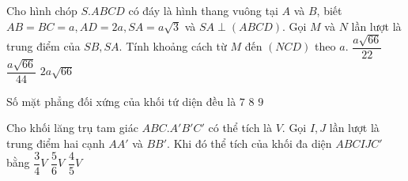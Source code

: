 				
	\begin{ex} %
	Cho hình chóp $S.ABCD$ có đáy là hình thang vuông tại $A$ và $B$, biết $AB = BC = a, AD = 2a, SA = a\sqrt{3}$ và $SA \perp (ABCD)$. Gọi $M$ và $N$ lần lượt là trung điểm của $SB, SA$. Tính khoảng cách từ $M$ đến $(NCD)$ theo $a$.
		 {$\dfrac{a\sqrt{66}}{22}$} {\True $\dfrac{a\sqrt{66}}{44}$} {$2a\sqrt{66}$}
	
	\end{ex}
					
	\begin{ex} %
	Số mặt phẳng đối xứng của khối tứ diện đều là
		 {$7$} {$8$} {$9$}
	
	\end{ex}
					
	\begin{ex} %
	Cho khối lăng trụ tam giác $ABC.A'B'C'$ có thể tích là $V$. Gọi $I,J$ lần lượt là trung điểm hai cạnh $AA'$ và $BB'$. Khi đó thể tích của khối đa diện $ABCIJC'$ bằng
		 {$\dfrac{3}{4}V$} {$\dfrac{5}{6}V$} {$\dfrac{4}{5}V$}
	\end{ex}
					
